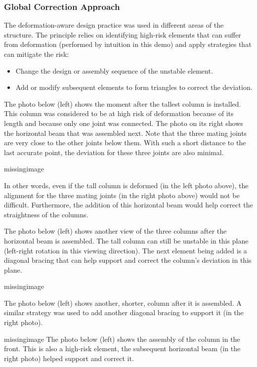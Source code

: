 \subsubsection{Global Correction Approach}
The deformation-aware design practice was used in different areas of the structure. The principle relies on identifying high-risk elements that can suffer from deformation (performed by intuition in this demo) and apply strategies that can mitigate the risk:
\begin{itemize}
    \item Change the design or assembly sequence of the unstable element.
    \item Add or modify subsequent elements to form triangles to correct the deviation.
\end{itemize}

The photo below (left) shows the moment after the tallest column is installed. This column was considered to be at high risk of deformation because of its length and because only one joint was connected. The photo on its right shows the horizontal beam that was assembled next. Note that the three mating joints are very close to the other joints below them. With such a short distance to the last accurate point, the deviation for these three joints are also minimal. 

missingimage

In other words, even if the tall column is deformed (in the left photo above), the alignment for the three mating joints (in the right photo above) would not be difficult. Furthermore, the addition of this horizontal beam would help correct the straightness of the columns.

The photo below (left) shows another view of the three columns after the horizontal beam is assembled. The tall column can still be unstable in this plane (left-right rotation in this viewing direction). The next element being added is a diagonal bracing that can help support and correct the column’s deviation in this plane.

missingimage

The photo below (left) shows another, shorter, column after it is assembled. A similar strategy was used to add another diagonal bracing to support it (in the right photo).

missingimage
The photo below (left) shows the assembly of the column in the front. This is also a high-risk element, the subsequent horizontal beam (in the right photo) helped support and correct it.


